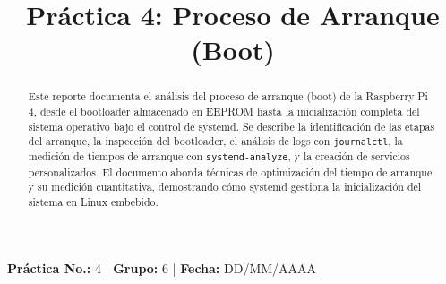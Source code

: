 \documentclass[conference]{IEEEtran}
\begin{document}
\title{Práctica 4: Proceso de Arranque (Boot)}

\author{
	\and
	\and
	\and
	\and
	\and
}

\maketitle

\begin{center}
	\vspace{-0.3cm}
	{\small
		\textbf{Práctica No.:} 4 \quad | \quad
		\textbf{Grupo:} 6 \quad | \quad
		\textbf{Fecha:} DD/MM/AAAA
	}
	\vspace{0.2cm}
\end{center}

\begin{abstract}
	Este reporte documenta el análisis del proceso de arranque (boot) de la Raspberry Pi 4, desde el bootloader almacenado en EEPROM hasta la inicialización completa del sistema operativo bajo el control de systemd. Se describe la identificación de las etapas del arranque, la inspección del bootloader, el análisis de logs con \texttt{journalctl}, la medición de tiempos de arranque con \texttt{systemd-analyze}, y la creación de servicios personalizados. El documento aborda técnicas de optimización del tiempo de arranque y su medición cuantitativa, demostrando cómo systemd gestiona la inicialización del sistema en Linux embebido.
\end{abstract}
\end{document}
